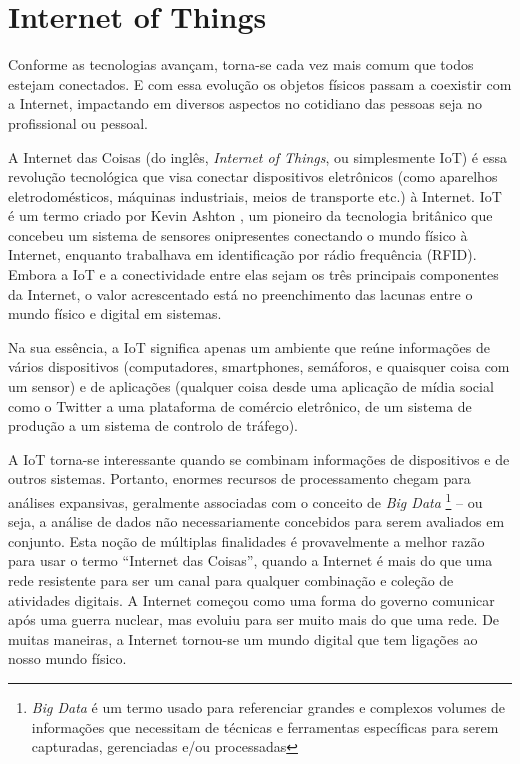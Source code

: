 \section{Internet of Things}
\label{sec:iot}

Conforme as tecnologias avançam, torna-se cada vez mais comum que todos estejam conectados. E com essa evolução os objetos físicos passam a coexistir com a Internet, impactando em diversos aspectos no cotidiano das pessoas seja no profissional ou pessoal.

A Internet das Coisas (do inglês, \textit{Internet of Things}, ou simplesmente IoT) é essa revolução tecnológica que visa conectar dispositivos eletrônicos (como aparelhos eletrodomésticos, máquinas industriais, meios de transporte etc.) à Internet. IoT é um termo criado por Kevin Ashton \cite{Kevin}, um pioneiro da tecnologia britânico que concebeu um sistema de sensores onipresentes conectando o mundo físico à Internet, enquanto trabalhava em identificação por rádio frequência (RFID). Embora a IoT e a conectividade entre elas sejam os três principais componentes da Internet, o valor acrescentado está no preenchimento das lacunas entre o mundo físico e digital em sistemas.

Na sua essência, a IoT significa apenas um ambiente que reúne informações de vários dispositivos (computadores, smartphones, semáforos, e quaisquer coisa com um sensor) e de aplicações (qualquer coisa desde uma aplicação de mídia social como o Twitter a uma plataforma de comércio eletrônico, de um sistema de produção a um sistema de controlo de tráfego).

A IoT torna-se interessante quando se combinam informações de dispositivos e de outros sistemas. Portanto, enormes recursos de processamento chegam para análises expansivas, geralmente associadas com o conceito de \textit{Big Data} \footnote{\textit{Big Data} é um termo usado para referenciar grandes e complexos volumes de informações que necessitam de técnicas e ferramentas específicas para serem capturadas, gerenciadas e/ou processadas} – ou seja, a análise de dados não necessariamente concebidos para serem avaliados em conjunto. Esta noção de múltiplas finalidades é provavelmente a melhor razão para usar o termo “Internet das Coisas”, quando a Internet é mais do que uma rede resistente para ser um canal para qualquer combinação e coleção de atividades digitais. A Internet começou como uma forma do governo comunicar após uma guerra nuclear, mas evoluiu para ser muito mais do que uma rede. De muitas maneiras, a Internet tornou-se um mundo digital que tem ligações ao nosso mundo físico.

